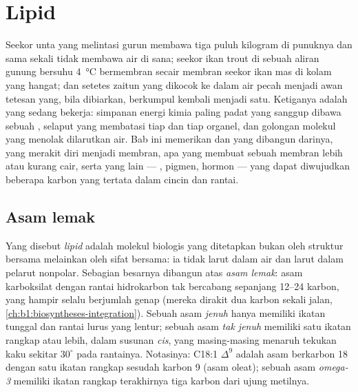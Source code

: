 \chapter{Lipid}\label{ch:b1:lipids}

Seekor unta yang melintasi gurun membawa tiga puluh kilogram  di
punuknya dan sama sekali tidak membawa air di sana; seekor ikan trout di
sebuah aliran gunung bersuhu \qty{4}{\celsius} bermembran secair membran
seekor ikan mas di kolam yang hangat; dan setetes  zaitun yang
dikocok ke dalam air pecah menjadi awan tetesan yang, bila dibiarkan,
berkumpul kembali menjadi satu. Ketiganya adalah  yang sedang
bekerja: simpanan energi kimia paling padat yang sanggup dibawa sebuah
, selaput yang membatasi tiap  dan tiap organel, dan
golongan molekul yang menolak dilarutkan air. Bab ini memerikan  dan  yang dibangun darinya,   yang merakit diri
menjadi membran, apa yang membuat sebuah membran lebih atau kurang cair,
serta  yang lain --- , pigmen, hormon --- yang dapat
diwujudkan beberapa karbon yang tertata dalam cincin dan rantai.

\section{Asam lemak}

\begin{definition}\label{def:b1:lipids:fattyacid}
Yang disebut \emph{lipid} adalah molekul biologis yang
ditetapkan bukan oleh struktur bersama melainkan oleh sifat bersama:
ia tidak larut dalam air dan larut dalam pelarut nonpolar. Sebagian
besarnya dibangun atas \emph{asam lemak}: asam
karboksilat dengan rantai hidrokarbon tak bercabang sepanjang
\qtyrange{12}{24}{} karbon, yang hampir selalu berjumlah genap (mereka
dirakit dua karbon sekali jalan,
\cref{ch:b1:biosyntheses-integration}). Sebuah asam 
\emph{jenuh} hanya memiliki ikatan tunggal dan
rantai lurus yang lentur; sebuah asam  \emph{tak jenuh}
memiliki satu ikatan rangkap atau lebih, dalam susunan
\emph{cis}, yang masing-masing menaruh tekukan kaku sekitar $30^\circ$
pada rantainya. Notasinya: C18:1 $\Delta^9$ adalah asam berkarbon 18
dengan satu ikatan rangkap sesudah karbon 9 (asam oleat); sebuah asam
\emph{omega-3} memiliki ikatan rangkap terakhirnya tiga karbon dari
ujung metilnya.
\end{definition}

